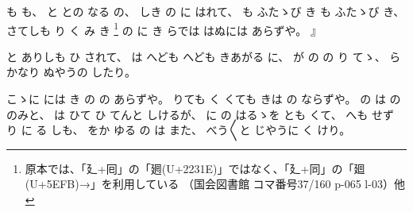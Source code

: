 %
も
も、
%
と
との
なる
の、
%
しき
の
に
はれて、
%
も
ふたゝび%
き
も
ふたゝび%
き、
%
さてしも
り
く
み
き
\footnote{原本では、「廴+囘」の「𢌞(U+2231E)」ではなく、「廴+同」の「廻(U+5EFB)→」を利用している
（国会図書館 コマ番号37/160 p-065 l-03）他}%
の
に
き
らでは
はぬには
あらずや。
』

%
と
ありしも
ひ
されて、
%
は
へども
へども
きあがる
に、
%
が
の%
の%
り
てゝ、%
%
らかなり
ぬやうの
したり。

%
こゝに%
には
き
の
の
あらずや。
%
りても
く
くても
きは
の
ならずや。
%
の
は
の
のみと、
%
は
ひて
ひ
てんと
しけるが、
%
に%
の
はるゝを%
とも
くて、
%
へも
せず
り
に
る
しも、
%
をか
ゆる
の
は
また、
%
べう〳〵と
じやうに
く
けり。

